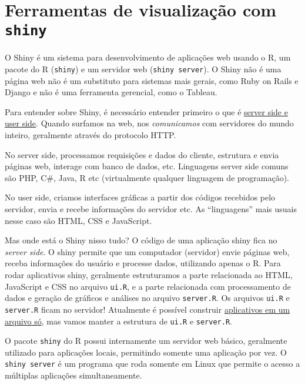 \documentclass[]{book}
\begin{document}
\section{\texorpdfstring{Ferramentas de visualização com
\texttt{shiny}}{Ferramentas de visualização com shiny}}\label{ferramentas-de-visualizacao-com-shiny}

O Shiny é um sistema para desenvolvimento de aplicações web usando o R,
um pacote do R (\texttt{shiny}) e um servidor web
(\texttt{shiny\ server}). O Shiny não é uma página web não é um
substituto para sistemas mais gerais, como Ruby on Rails e Django e não
é uma ferramenta gerencial, como o Tableau.

Para entender sobre Shiny, é necessário entender primeiro o que é
\href{http://programmers.stackexchange.com/a/171210}{server side e user
side}. Quando surfamos na web, nos \emph{comunicamos} com servidores do
mundo inteiro, geralmente através do protocolo HTTP.

No server side, processamos requisições e dados do cliente, estrutura e
envia páginas web, interage com banco de dados, etc. Linguagens server
side comuns são PHP, C\#, Java, R etc (virtualmente qualquer linguagem
de programação).

No user side, criamos interfaces gráficas a partir dos códigos recebidos
pelo servidor, envia e recebe informações do servidor etc. As
``linguagens'' mais usuais nesse caso são HTML, CSS e JavaScript.

Mas onde está o Shiny nisso tudo? O código de uma aplicação shiny fica
no \emph{server side}. O shiny permite que um computador (servidor)
envie páginas web, receba informações do usuário e processe dados,
utilizando apenas o R. Para rodar aplicativos shiny, geralmente
estruturamos a parte relacionada ao HTML, JavaScript e CSS no arquivo
\texttt{ui.R}, e a parte relacionada com processamento de dados e
geração de gráficos e análises no arquivo \texttt{server.R}. Os arquivos
\texttt{ui.R} e \texttt{server.R} ficam no servidor! Atualmente é
possível construir
\href{http://shiny.rstudio.com/articles/single-file.html}{aplicativos em
um arquivo só}, mas vamos manter a estrutura de \texttt{ui.R} e
\texttt{server.R}.

O pacote \texttt{shiny} do R possui internamente um servidor web básico,
geralmente utilizado para aplicações locais, permitindo somente uma
aplicação por vez. O \texttt{shiny\ server} é um programa que roda
somente em Linux que permite o acesso a múltiplas aplicações
simultaneamente.
\end{document}
